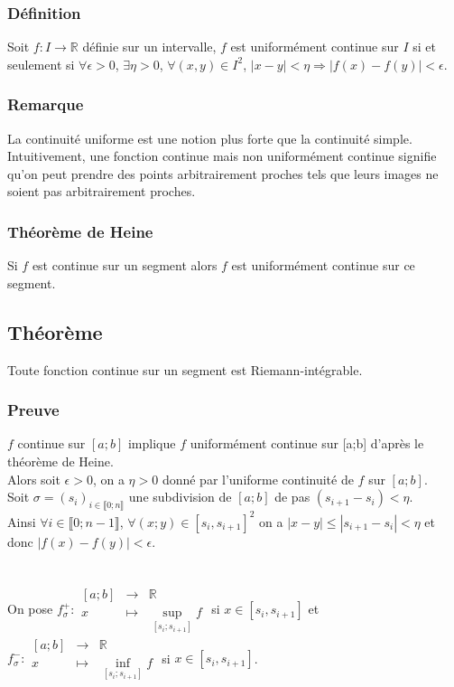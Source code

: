 \documentclass[a4paper,10pt]{book} %
\newcommand{\R}{\mathbb{R}}
\begin{document}
\subsubsection{Définition}
Soit $f : I\rightarrow \R$ définie sur un intervalle, $f$ est uniformément continue sur $I$ si et seulement si $\forall \epsilon>0$, $\exists \eta>0$, $\forall (x,y)\in I^2$, $|x-y|<\eta \Rightarrow |f(x)-f(y)|<\epsilon$.

\subsubsection{Remarque}
La continuité uniforme est une notion plus forte que la continuité simple. Intuitivement, une fonction continue mais non uniformément continue signifie qu'on peut prendre des points arbitrairement proches tels que leurs images ne soient pas arbitrairement proches.

\subsubsection{Théorème de Heine}
Si $f$ est continue sur un segment alors $f$ est uniformément continue sur ce segment.

\subsection{Théorème}
Toute fonction continue sur un segment est Riemann-intégrable.

\subsubsection{Preuve}
$f$ continue sur $[a;b]$ implique $f$ uniformément continue sur [a;b] d'après le théorème de Heine.\\

Alors soit $\epsilon>0$, on a $\eta>0$ donné par l'uniforme continuité de $f$ sur $[a;b]$.\\
Soit $\sigma =(s_i)_{i\in \llbracket 0;n \rrbracket}$ une subdivision de $[a;b]$ de pas $(s_{i+1}-s_i) < \eta$.\\

Ainsi $\forall i\in \llbracket 0;n-1\rrbracket$, $\forall (x;y) \in [s_i,s_{i+1}]^2$ on a $|x-y|\leq |s_{i+1}-s_i|<\eta$ et donc $|f(x)-f(y)|<\epsilon$.\\\\\\
On pose $f_{\sigma}^+ : \begin{array}{rcl} [a;b] &\rightarrow& \R \\ x&\mapsto& \underset{[s_i;s_{i+1}]} {\sup}f \end{array}$ si $x\in [s_i,s_{i+1}]$
et $f_{\sigma}^- : \begin{array}{rcl} [a;b] &\rightarrow& \R \\ x&\mapsto& \underset{[s_i;s_{i+1}]} {\inf}f \end{array}$ si $x\in [s_i,s_{i+1}]$.\\\\
\end{document}
